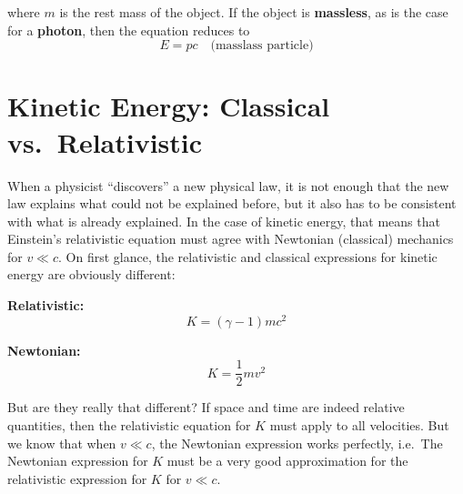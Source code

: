 where $m$ is the rest mass of the object. If the object is \textbf{massless},
as is the case for a \textbf{photon}, then the equation reduces to
\begin{equation}
  \boxed{E=pc}\quad\text{(masslass particle)}
\end{equation}







\section{Kinetic Energy: Classical vs.\ Relativistic}
When a physicist ``discovers'' a new physical law, it is not enough that the
new law explains what could not be explained before, but it also has to be
consistent with what is already explained. In the case of kinetic energy, that
means that Einstein's relativistic equation must agree with Newtonian
(classical) mechanics for $v\ll c$. On first glance, the relativistic and
classical expressions for kinetic energy are obviously different:
\begin{center}
  \begin{minipage}{.3\textwidth}
    \centering
    \textbf{Relativistic:}
    \begin{displaymath}
      K=(\gamma-1)mc^2
    \end{displaymath}
  \end{minipage}
  \begin{minipage}{.3\textwidth}
    \centering
    \textbf{Newtonian:}
    \begin{displaymath}
      K=\frac12mv^2
    \end{displaymath}
  \end{minipage}
\end{center}

But are they really that different? If space and time are indeed relative
quantities, then the relativistic equation for $K$ must apply to all velocities.
But we know that when $v\ll c$, the Newtonian expression works perfectly,
i.e.\ The Newtonian expression for $K$ must be a very good approximation for
the relativistic expression for $K$ for $v\ll c$.

